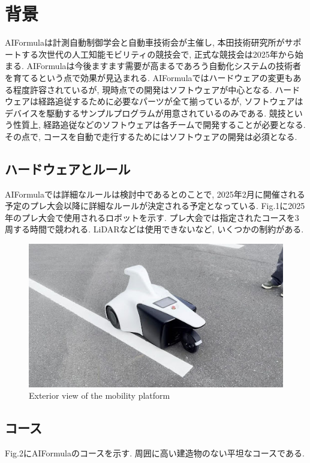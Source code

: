
\section{背景}
AIFormulaは計測自動制御学会と自動車技術会が主催し, 本田技術研究所がサポートする次世代の人工知能モビリティの競技会で, 正式な競技会は2025年から始まる.
AIFormulaは今後ますます需要が高まるであろう自動化システムの技術者を育てるという点で効果が見込まれる.
AIFormulaではハードウェアの変更もある程度許容されているが, 現時点での開発はソフトウェアが中心となる.
ハードウェアは経路追従するために必要なパーツが全て揃っているが, ソフトウェアはデバイスを駆動するサンプルプログラムが用意されているのみである.
競技という性質上, 経路追従などのソフトウェアは各チームで開発することが必要となる.
その点で, コースを自動で走行するためにはソフトウェアの開発は必須となる.

\subsection{ハードウェアとルール}
AIFormulaでは詳細なルールは検討中であるとのことで, 2025年2月に開催される予定のプレ大会以降に詳細なルールが決定される予定となっている.
Fig.1に2025年のプレ大会で使用されるロボットを示す.
プレ大会では指定されたコースを3周する時間で競われる.
LiDARなどは使用できないなど, いくつかの制約がある.

\begin{figure}[H]
  \centering
 \includegraphics[keepaspectratio, scale=0.6]
      {images/ExteriorViewOfTheMobilityPlatform.png}
 \caption{Exterior view of the mobility platform}
 \label{fig:robot view}
\end{figure}

\subsection{コース}
Fig.2にAIFormulaのコースを示す.
周囲に高い建造物のない平坦なコースである.


